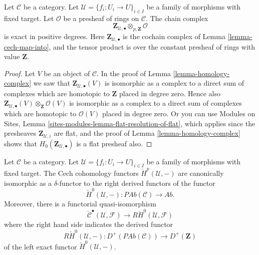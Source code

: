 \begin{lemma}
\label{lemma-complex-tensored-still-exact}
Let $\mathcal{C}$ be a category.
Let $\mathcal{U} = \{f_i : U_i \to U\}_{i \in I}$ be a family of morphisms
with fixed target.
Let $\mathcal{O}$ be a presheaf of rings on $\mathcal{C}$.
The chain complex
$$
\mathbf{Z}_{\mathcal{U}, \bullet}
\otimes_{p, \mathbf{Z}}
\mathcal{O}
$$
is exact in positive degrees. Here $\mathbf{Z}_{\mathcal{U}, \bullet}$
is the cochain complex of Lemma \ref{lemma-cech-map-into}, and
the tensor product is over the constant presheaf of rings
with value $\mathbf{Z}$.
\end{lemma}

\begin{proof}
Let $V$ be an object of $\mathcal{C}$.
In the proof of Lemma \ref{lemma-homology-complex} we saw that
$\mathbf{Z}_{\mathcal{U}, \bullet}(V)$ is isomorphic as a complex
to a direct sum of complexes which are homotopic to $\mathbf{Z}$
placed in degree zero. Hence also
$\mathbf{Z}_{\mathcal{U}, \bullet}(V) \otimes_\mathbf{Z} \mathcal{O}(V)$
is isomorphic as a complex to a direct sum of complexes which are homotopic
to $\mathcal{O}(V)$ placed in degree zero.
Or you can use
Modules on Sites, Lemma \ref{sites-modules-lemma-flat-resolution-of-flat},
which applies since the presheaves $\mathbf{Z}_{\mathcal{U}, i}$ are flat,
and the proof of Lemma \ref{lemma-homology-complex} shows that
$H_0(\mathbf{Z}_{\mathcal{U}, \bullet})$ is a flat presheaf also.
\end{proof}

\begin{lemma}
\label{lemma-cech-cohomology-derived-presheaves}
Let $\mathcal{C}$ be a category.
Let $\mathcal{U} = \{f_i : U_i \to U\}_{i \in I}$ be a family of morphisms
with fixed target.
The Cech cohomology functors $\check{H}^p(\mathcal{U}, -)$
are canonically isomorphic as a $\delta$-functor to
the right derived functors of the functor
$$
\check{H}^0(\mathcal{U}, -) :
\textit{PAb}(\mathcal{C})
\longrightarrow
\textit{Ab}.
$$
Moreover, there is a functorial quasi-isomorphism
$$
\check{\mathcal{C}}^\bullet(\mathcal{U}, \mathcal{F})
\longrightarrow
R\check{H}^0(\mathcal{U}, \mathcal{F})
$$
where the right hand side indicates the derived functor
$$
R\check{H}^0(\mathcal{U}, -) :
D^{+}(\textit{PAb}(\mathcal{C}))
\longrightarrow
D^{+}(\mathbf{Z})
$$
of the left exact functor $\check{H}^0(\mathcal{U}, -)$.
\end{lemma}

